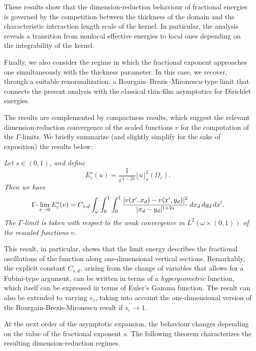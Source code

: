 \documentclass[11pt]{article}
\def\e{\varepsilon}
\begin{document}
These results show that the dimension-reduction behaviour of fractional energies is
governed by the competition between the thickness of the domain and the
characteristic interaction length scale of the kernel. In particular, the analysis reveals a
transition from nonlocal effective energies to local ones depending on the integrability
of the kernel.

Finally, we also consider the regime in which the fractional exponent approaches one
simultaneously with the thickness parameter. In this case, we recover, through a suitable
renormalization, a Bourgain--Brezis--Mironescu-type limit that connects the present
analysis with the classical thin-film asymptotics for Dirichlet energies.

The results are complemented by compactness results, which suggest the relevant dimension-reduction convergence of the scaled functions $v$ for the computation of the $\Gamma$-limits.
We briefly summarize (and slightly simplify for the sake of exposition) the results below:

\smallskip
{}
{\em Let $s\in(0, 1)$, and define 
$$
E^s_\e(u)=\frac1{\e^{1-2s}}\lfloor u\rfloor^2_{s}(\Omega_\e).
$$
Then we have 
\begin{equation}
    \Gamma\hbox{-}\lim_{\e\to 0} E^s_\e(v)=C_{s,d}\int_{\omega}\int_0^1\int_0^1\frac{|v(x^\prime, x_d)-v(x^\prime, y_d)|^2}{|x_d-y_d|^{1+2s}}\, dx_d\, dy_d\, dx^\prime.
  \end{equation}
The $\Gamma$-limit is taken with respect to the weak convergence in $L^2(\omega \times (0,1))$ of the rescaled functions $v$.}

This result, in particular, shows that the limit energy describes the fractional oscillations of the function along one-dimensional vertical sections.
Remarkably, the explicit constant $C_{s,d}$,
arising from the change of variables that allows for a Fubini-type argument, can be written in terms of a \emph{hypergeometric} function, which itself can be expressed in terms of Euler's Gamma function.
The result can also be extended to varying $s_\e$, taking into account the one-dimensional version of the Bourgain-Brezis-Mironescu result if $s_\e\to 1$.

At the next order of the asymptotic expansion, the behaviour changes depending on the
value of the fractional exponent $s$. The following theorem characterizes the resulting
dimension-reduction regimes.
\end{document}
